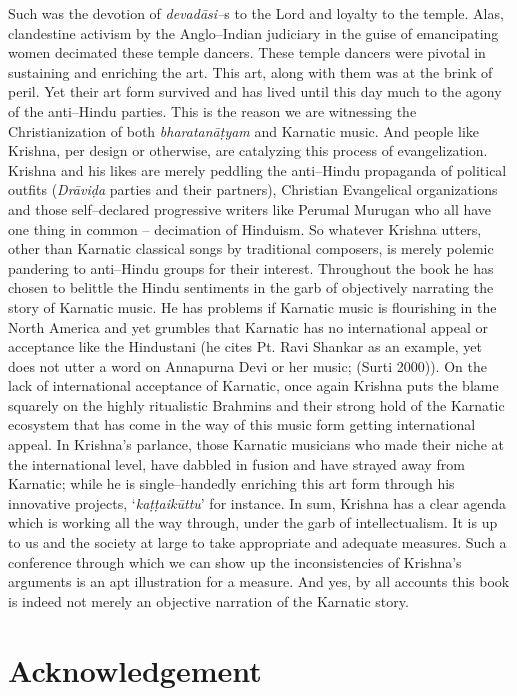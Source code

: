Such was the devotion of \textit{devadāsi–}s to the Lord and loyalty to the temple. Alas, clandestine activism by the Anglo–Indian judiciary in the guise of emancipating women decimated these temple dancers. These temple dancers were pivotal in sustaining and enriching the art. This art, along with them was at the brink of peril. Yet their art form survived and has lived until this day much to the agony of the anti–Hindu parties. This is the reason we are witnessing the Christianization of both \textit{bharatanāṭyam} and Karnatic music. And people like Krishna, per design or otherwise, are catalyzing this process of evangelization. Krishna and his likes are merely peddling the anti–Hindu propaganda of political outfits (\textit{Drāviḍa} parties and their partners), Christian Evangelical organizations and those self–declared progressive writers like Perumal Murugan who all have one thing in common – decimation of Hinduism. So whatever Krishna utters, other than Karnatic classical songs by traditional composers, is merely polemic pandering to anti–Hindu groups for their interest. Throughout the book he has chosen to belittle the Hindu sentiments in the garb of objectively narrating the story of Karnatic music. He has problems if Karnatic music is flourishing in the North America and yet grumbles that Karnatic has no international appeal or acceptance like the Hindustani (he cites Pt. Ravi Shankar as an example, yet does not utter a word on Annapurna Devi or her music; (Surti 2000)). On the lack of international acceptance of Karnatic, once again Krishna puts the blame squarely on the highly ritualistic Brahmins and their strong hold of the Karnatic ecosystem that has come in the way of this music form getting international appeal. In Krishna’s parlance, those Karnatic musicians who made their niche at the international level, have dabbled in fusion and have strayed away from Karnatic; while he is single–handedly enriching this art form through his innovative projects, ‘\textit{kaṭṭaikūttu}’ for instance. In sum, Krishna has a clear agenda which is working all the way through, under the garb of intellectualism. It is up to us and the society at large to take appropriate and adequate measures. Such a conference through which we can show up the inconsistencies of Krishna’s arguments is an apt illustration for a measure. And yes, by all accounts this book is indeed not merely an objective narration of the Karnatic story.


\section*{Acknowledgement}

